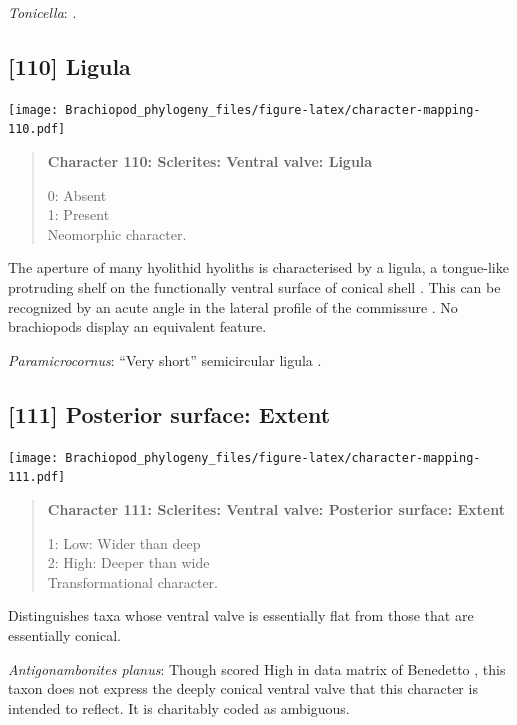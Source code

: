 \documentclass[openany]{book}
\begin{document}
\hypertarget{Tonicella-coding-109}{}
\emph{Tonicella}: \citep{Schwabe2010}.

\subsection*{{[}110{]} Ligula}\label{ligula}

\texttt{[image: Brachiopod\_phylogeny\_files/figure-latex/character-mapping-110.pdf]}

\begin{quote}
\textbf{Character 110: Sclerites: Ventral valve: Ligula}

0: Absent\\
1: Present\\
Neomorphic character.
\end{quote}

The aperture of many hyolithid hyoliths is characterised by a ligula, a
tongue-like protruding shelf on the functionally ventral surface of
conical shell \citep{MartiMus2005}. This can be recognized by an acute
angle in the lateral profile of the commissure \citep[see second figure
on p.~91 of][]{Marek1966}. No brachiopods display an equivalent feature.

\hypertarget{Paramicrocornus-coding-110}{}
\emph{Paramicrocornus}: ``Very short'' semicircular ligula
\citep{Zhang2018Ahyolithid}.

\subsection*{{[}111{]} Posterior surface:
Extent}\label{posterior-surface-extent}

\texttt{[image: Brachiopod\_phylogeny\_files/figure-latex/character-mapping-111.pdf]}

\begin{quote}
\textbf{Character 111: Sclerites: Ventral valve: Posterior surface:
Extent}

1: Low: Wider than deep\\
2: High: Deeper than wide\\
Transformational character.
\end{quote}

Distinguishes taxa whose ventral valve is essentially flat from those
that are essentially conical.

\hypertarget{Antigonambonites_planus-coding-111}{}
\emph{Antigonambonites planus}: Though scored High in data matrix of
Benedetto \citeyearpar{Benedetto2009iChaniella}, this taxon
\citep[see][fig. 508]{Williams2000LinguliformeaCraniiformea} does not
express the deeply conical ventral valve that this character is intended
to reflect. It is charitably coded as ambiguous.
\end{document}

